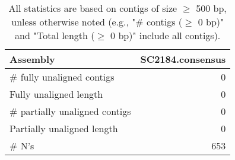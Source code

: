 \documentclass[12pt,a4paper]{article}
\begin{document}
\begin{table}[ht]
\begin{center}
\caption{All statistics are based on contigs of size $\geq$ 500 bp, unless otherwise noted (e.g., "\# contigs ($\geq$ 0 bp)" and "Total length ($\geq$ 0 bp)" include all contigs).}
\begin{tabular}{|l*{1}{|r}|}
\hline
Assembly & SC2184.consensus \\ \hline
\# fully unaligned contigs & 0 \\ \hline
Fully unaligned length & 0 \\ \hline
\# partially unaligned contigs & 0 \\ \hline
Partially unaligned length & 0 \\ \hline
\# N's & 653 \\ \hline
\end{tabular}
\end{center}
\end{table}
\end{document}
